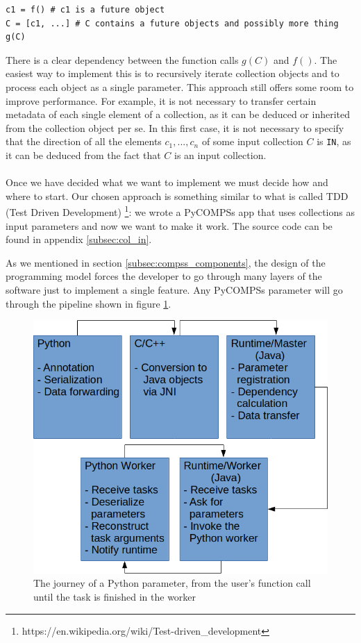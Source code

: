 \begin{verbatim}
c1 = f() # c1 is a future object
C = [c1, ...] # C contains a future objects and possibly more thing
g(C)
\end{verbatim}
There is a clear dependency between the function calls $g(C)$ and $f()$. The easiest way to implement this is to recursively iterate collection objects and to process each object as a single parameter. This approach still offers some room to improve performance. For example, it is not necessary to transfer certain metadata of each single element of a collection, as it can be deduced or inherited from the collection object per se. In this first case, it is not necessary to specify that the direction of all the elements $c_1, ..., c_n$ of some input collection $C$ is \verb|IN|, as it can be deduced from the fact that $C$ is an input collection.\\
\\
Once we have decided what we want to implement we must decide how and where to start. Our chosen approach is something similar to what is called TDD (Test Driven Development) \footnote{https://en.wikipedia.org/wiki/Test-driven\_development}: we wrote a PyCOMPSs app that uses collections as input parameters and now we want to make it work. The source code can be found in appendix \ref{subsec:col_in}.

As we mentioned in section \ref{subsec:compss_components}, the design of the programming model forces the developer to go through many layers of the software just to implement a single feature. Any PyCOMPSs parameter will go through the pipeline shown in figure \ref{fig:parameter_pipeline}.

\begin{figure}[ht!]
\centering
\includegraphics[scale = 0.5]{figures/parameter_pipeline.png}
\caption{The journey of a Python parameter, from the user's function call until the task is finished in the worker}
\label{fig:parameter_pipeline}
\end{figure}

